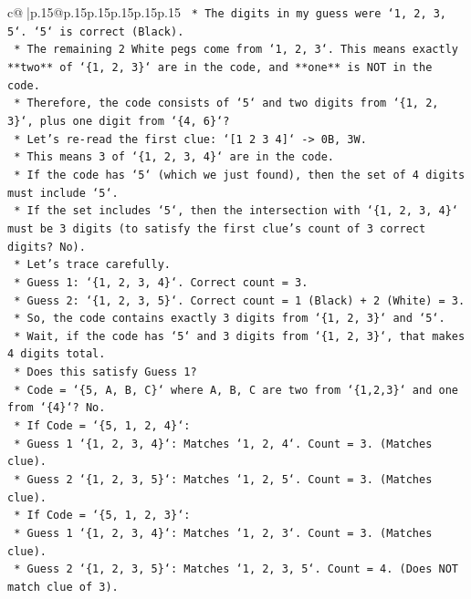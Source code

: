 \documentclass{article}
\begin{document}
{\begin{supertabular}{c@{$\;$}|p{.15\linewidth}@{}p{.15\linewidth}p{.15\linewidth}p{.15\linewidth}p{.15\linewidth}p{.15\linewidth}}
{{{\texttt{    *   The digits in my guess were `1, 2, 3, 5`. `5` is correct (Black).} \\
\texttt{    *   The remaining 2 White pegs come from `1, 2, 3`. This means exactly **two** of `\{1, 2, 3\}` are in the code, and **one** is NOT in the code.} \\
\texttt{    *   Therefore, the code consists of `5` and two digits from `\{1, 2, 3\}`, plus one digit from `\{4, 6\}`?} \\
\texttt{    *   Let's re{-}read the first clue: `{[}1 2 3 4{]}` {-}> 0B, 3W.} \\
\texttt{        *   This means 3 of `\{1, 2, 3, 4\}` are in the code.} \\
\texttt{        *   If the code has `5` (which we just found), then the set of 4 digits must include `5`.} \\
\texttt{        *   If the set includes `5`, then the intersection with `\{1, 2, 3, 4\}` must be 3 digits (to satisfy the first clue's count of 3 correct digits? No).} \\
\texttt{        *   Let's trace carefully.} \\
\texttt{        *   Guess 1: `\{1, 2, 3, 4\}`. Correct count = 3.} \\
\texttt{        *   Guess 2: `\{1, 2, 3, 5\}`. Correct count = 1 (Black) + 2 (White) = 3.} \\
\texttt{        *   So, the code contains exactly 3 digits from `\{1, 2, 3\}` and `5`.} \\
\texttt{        *   Wait, if the code has `5` and 3 digits from `\{1, 2, 3\}`, that makes 4 digits total.} \\
\texttt{        *   Does this satisfy Guess 1?} \\
\texttt{            *   Code = `\{5, A, B, C\}` where A, B, C are two from `\{1,2,3\}` and one from `\{4\}`? No.} \\
\texttt{            *   If Code = `\{5, 1, 2, 4\}`:} \\
\texttt{                *   Guess 1 `\{1, 2, 3, 4\}`: Matches `1, 2, 4`. Count = 3. (Matches clue).} \\
\texttt{                *   Guess 2 `\{1, 2, 3, 5\}`: Matches `1, 2, 5`. Count = 3. (Matches clue).} \\
\texttt{            *   If Code = `\{5, 1, 2, 3\}`:} \\
\texttt{                *   Guess 1 `\{1, 2, 3, 4\}`: Matches `1, 2, 3`. Count = 3. (Matches clue).} \\
\texttt{                *   Guess 2 `\{1, 2, 3, 5\}`: Matches `1, 2, 3, 5`. Count = 4. (Does NOT match clue of 3).} \\
}}}
\end{supertabular}}
\end{document}
